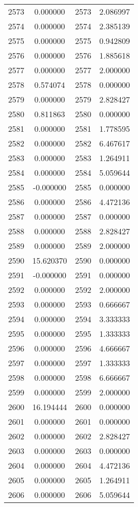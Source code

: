 \documentclass[12pt]{article}
\begin{document}
\begin{longtable}{@{}cccc@{}}
2573 & 0.000000 & 2573 & 2.086997 \\
2574 & 0.000000 & 2574 & 2.385139 \\
2575 & 0.000000 & 2575 & 0.942809 \\
2576 & 0.000000 & 2576 & 1.885618 \\
2577 & 0.000000 & 2577 & 2.000000 \\
2578 & 0.574074 & 2578 & 0.000000 \\
2579 & 0.000000 & 2579 & 2.828427 \\
2580 & 0.811863 & 2580 & 0.000000 \\
2581 & 0.000000 & 2581 & 1.778595 \\
2582 & 0.000000 & 2582 & 6.467617 \\
2583 & 0.000000 & 2583 & 1.264911 \\
2584 & 0.000000 & 2584 & 5.059644 \\
2585 & -0.000000 & 2585 & 0.000000 \\
2586 & 0.000000 & 2586 & 4.472136 \\
2587 & 0.000000 & 2587 & 0.000000 \\
2588 & 0.000000 & 2588 & 2.828427 \\
2589 & 0.000000 & 2589 & 2.000000 \\
2590 & 15.620370 & 2590 & 0.000000 \\
2591 & -0.000000 & 2591 & 0.000000 \\
2592 & 0.000000 & 2592 & 2.000000 \\
2593 & 0.000000 & 2593 & 0.666667 \\
2594 & 0.000000 & 2594 & 3.333333 \\
2595 & 0.000000 & 2595 & 1.333333 \\
2596 & 0.000000 & 2596 & 4.666667 \\
2597 & 0.000000 & 2597 & 1.333333 \\
2598 & 0.000000 & 2598 & 6.666667 \\
2599 & 0.000000 & 2599 & 2.000000 \\
2600 & 16.194444 & 2600 & 0.000000 \\
2601 & 0.000000 & 2601 & 0.000000 \\
2602 & 0.000000 & 2602 & 2.828427 \\
2603 & 0.000000 & 2603 & 0.000000 \\
2604 & 0.000000 & 2604 & 4.472136 \\
2605 & 0.000000 & 2605 & 1.264911 \\
2606 & 0.000000 & 2606 & 5.059644 \\

\end{longtable}
\end{document}
